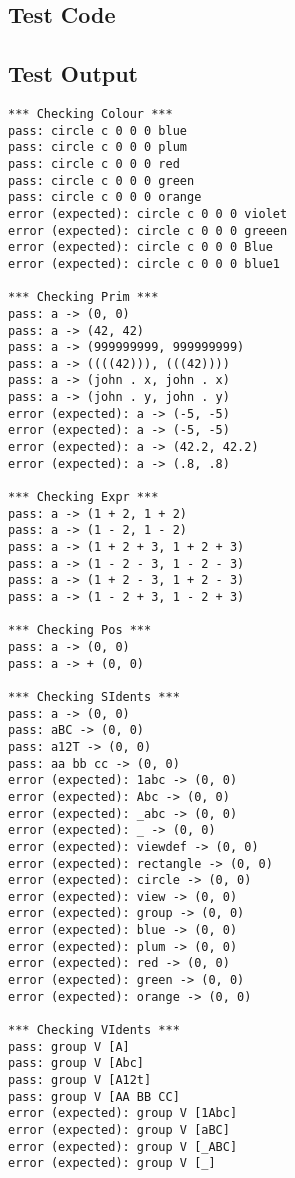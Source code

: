 \documentclass[
paper=a4,
oneside,
fontsize=11pt,
numbers=noenddot,
headinclude=false, %
footinclude=false, %
fleqn,             %
DIV=8
]{scrartcl}
\begin{document}

\subsection{Test Code}
\label{sec:test-code}


\subsection{Test Output}
\label{sec:test-output}

\begin{lstlisting}[caption=Session output: {\tt src/salsa/SalsaParserTest}, label=lst:testoutparser]
*** Checking Colour ***
pass: circle c 0 0 0 blue
pass: circle c 0 0 0 plum
pass: circle c 0 0 0 red
pass: circle c 0 0 0 green
pass: circle c 0 0 0 orange
error (expected): circle c 0 0 0 violet
error (expected): circle c 0 0 0 greeen
error (expected): circle c 0 0 0 Blue
error (expected): circle c 0 0 0 blue1

*** Checking Prim ***
pass: a -> (0, 0)
pass: a -> (42, 42)
pass: a -> (999999999, 999999999)
pass: a -> ((((42))), (((42))))
pass: a -> (john . x, john . x)
pass: a -> (john . y, john . y)
error (expected): a -> (-5, -5)
error (expected): a -> (-5, -5)
error (expected): a -> (42.2, 42.2)
error (expected): a -> (.8, .8)

*** Checking Expr ***
pass: a -> (1 + 2, 1 + 2)
pass: a -> (1 - 2, 1 - 2)
pass: a -> (1 + 2 + 3, 1 + 2 + 3)
pass: a -> (1 - 2 - 3, 1 - 2 - 3)
pass: a -> (1 + 2 - 3, 1 + 2 - 3)
pass: a -> (1 - 2 + 3, 1 - 2 + 3)

*** Checking Pos ***
pass: a -> (0, 0)
pass: a -> + (0, 0)

*** Checking SIdents ***
pass: a -> (0, 0)
pass: aBC -> (0, 0)
pass: a12T -> (0, 0)
pass: aa bb cc -> (0, 0)
error (expected): 1abc -> (0, 0)
error (expected): Abc -> (0, 0)
error (expected): _abc -> (0, 0)
error (expected): _ -> (0, 0)
error (expected): viewdef -> (0, 0)
error (expected): rectangle -> (0, 0)
error (expected): circle -> (0, 0)
error (expected): view -> (0, 0)
error (expected): group -> (0, 0)
error (expected): blue -> (0, 0)
error (expected): plum -> (0, 0)
error (expected): red -> (0, 0)
error (expected): green -> (0, 0)
error (expected): orange -> (0, 0)

*** Checking VIdents ***
pass: group V [A]
pass: group V [Abc]
pass: group V [A12t]
pass: group V [AA BB CC]
error (expected): group V [1Abc]
error (expected): group V [aBC]
error (expected): group V [_ABC]
error (expected): group V [_]


\end{lstlisting}
\end{document}
